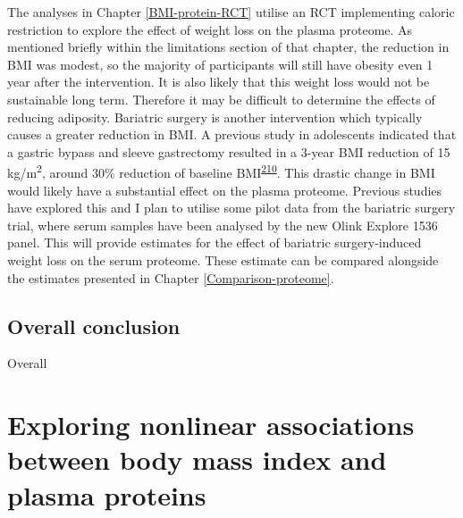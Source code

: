 \documentclass[11pt,twoside]{bristolthesis}
\begin{document}
The analyses in Chapter \ref{BMI-protein-RCT} utilise an RCT implementing caloric restriction to explore the effect of weight loss on the plasma proteome. As mentioned briefly within the limitations section of that chapter, the reduction in BMI was modest, so the majority of participants will still have obesity even 1 year after the intervention. It is also likely that this weight loss would not be sustainable long term. Therefore it may be difficult to determine the effects of reducing adiposity. Bariatric surgery is another intervention which typically causes a greater reduction in BMI. A previous study in adolescents indicated that a gastric bypass and sleeve gastrectomy resulted in a 3-year BMI reduction of 15 kg/m\textsuperscript{2}, around 30\% reduction of baseline BMI\textsuperscript{\protect\hyperlink{ref-Inge2016}{210}}. This drastic change in BMI would likely have a substantial effect on the plasma proteome. Previous studies have explored this and I plan to utilise some pilot data from the bariatric surgery trial, where serum samples have been analysed by the new Olink Explore 1536 panel. This will provide estimates for the effect of bariatric surgery-induced weight loss on the serum proteome. These estimate can be compared alongside the estimates presented in Chapter \ref{Comparison-proteome}.

\hypertarget{overall-conclusion}{%
\section{Overall conclusion}\label{overall-conclusion}}

Overall

\appendix

\hypertarget{Appendix-A}{%
\chapter{Exploring nonlinear associations between body mass index and plasma proteins}\label{Appendix-A}}
\end{document}
